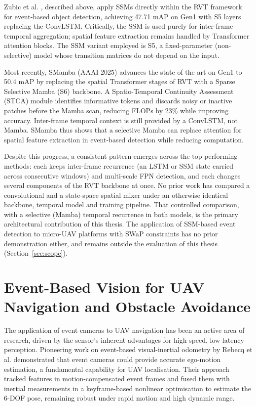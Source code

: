 \documentclass[11pt, a4paper]{report}
\begin{document}
Zubic et al. \cite{zubic2024state}, described above, apply SSMs directly within the RVT framework for event-based object detection, achieving 47.71 mAP on Gen1 with S5 layers replacing the ConvLSTM. Critically, the SSM is used purely for inter-frame temporal aggregation; spatial feature extraction remains handled by Transformer attention blocks. The SSM variant employed is S5, a fixed-parameter (non-selective) model whose transition matrices do not depend on the input. 

Most recently, SMamba \cite{yang2025smamba} (AAAI 2025) advances the state of the art on Gen1 to 50.4 mAP by replacing the spatial Transformer stages of RVT with a Sparse Selective Mamba (S6) backbone. A Spatio-Temporal Continuity Assessment (STCA) module identifies informative tokens and discards noisy or inactive patches before the Mamba scan, reducing FLOPs by 23\% while improving accuracy. Inter-frame temporal context is still provided by a ConvLSTM, not Mamba. SMamba thus shows that a selective Mamba can replace attention for spatial feature extraction in event-based detection while reducing computation. 

Despite this progress, a consistent pattern emerges across the top-performing methods: each keeps inter-frame recurrence (an LSTM or SSM state carried across consecutive windows) and multi-scale FPN detection, and each changes several components of the RVT backbone at once. No prior work has compared a convolutional and a state-space spatial mixer under an otherwise identical backbone, temporal model and training pipeline. That controlled comparison, with a selective (Mamba) temporal recurrence in both models, is the primary architectural contribution of this thesis. The application of SSM-based event detection to micro-UAV platforms with SWaP constraints has no prior demonstration either, and remains outside the evaluation of this thesis (Section~\ref{sec:scope}).

\section{Event-Based Vision for UAV Navigation and Obstacle Avoidance}
The application of event cameras to UAV navigation has been an active area of research, driven by the sensor's inherent advantages for high-speed, low-latency perception. Pioneering work on event-based visual-inertial odometry by Rebecq et al. \cite{rebecq2017real} demonstrated that event cameras could provide accurate ego-motion estimation, a fundamental capability for UAV localisation. Their approach tracked features in motion-compensated event frames and fused them with inertial measurements in a keyframe-based nonlinear optimisation to estimate the 6-DOF pose, remaining robust under rapid motion and high dynamic range. 
\end{document}
